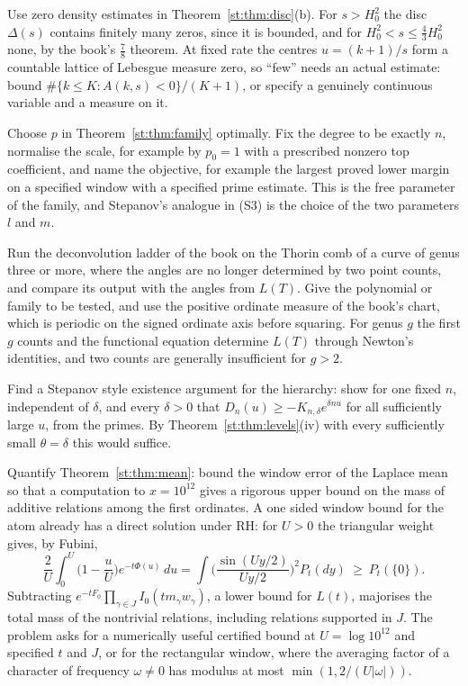 \begin{problem}\label{st:op:density}
Use zero density estimates in Theorem~\ref{st:thm:disc}(b). For $s>H_0^2$ the disc $\Delta(s)$ contains finitely many zeros, since it is bounded, and for $H_0^2<s\le\tfrac43H_0^2$ none, by the book's $\tfrac78$ theorem. At fixed rate the centres $u=(k+1)/s$ form a countable lattice of Lebesgue measure zero, so ``few'' needs an actual estimate: bound $\#\{k\le K:A(k,s)<0\}/(K+1)$, or specify a genuinely continuous variable and a measure on it.
\end{problem}
\begin{problem}\label{st:op:opt}
Choose $p$ in Theorem~\ref{st:thm:family} optimally. Fix the degree to be exactly $n$, normalise the scale, for example by $p_0=1$ with a prescribed nonzero top coefficient, and name the objective, for example the largest proved lower margin on a specified window with a specified prime estimate. This is the free parameter of the family, and Stepanov's analogue in (S3) is the choice of the two parameters $l$ and $m$.
\end{problem}
\begin{problem}\label{st:op:curve}
Run the deconvolution ladder of the book on the Thorin comb of a curve of genus three or more, where the angles are no longer determined by two point counts, and compare its output with the angles from $L(T)$. Give the polynomial or family to be tested, and use the positive ordinate measure of the book's chart, which is periodic on the signed ordinate axis before squaring. For genus $g$ the first $g$ counts and the functional equation determine $L(T)$ through Newton's identities, and two counts are generally insufficient for $g>2$.
\end{problem}
\begin{problem}\label{st:op:exist}
Find a Stepanov style existence argument for the hierarchy: show for one fixed $n$, independent of $\delta$, and every $\delta>0$ that $D_n(u)\ge-K_{n,\delta}e^{\delta nu}$ for all sufficiently large $u$, from the primes. By Theorem~\ref{st:thm:levels}(iv) with every sufficiently small $\theta=\delta$ this would suffice.
\end{problem}
\begin{problem}\label{st:op:window}
Quantify Theorem~\ref{st:thm:mean}: bound the window error of the Laplace mean so that a computation to $x=10^{12}$ gives a rigorous upper bound on the mass of additive relations among the first ordinates. A one sided window bound for the atom already has a direct solution under RH: for $U>0$ the triangular weight gives, by Fubini,
\[
\frac2U\int_0^U\Big(1-\frac uU\Big)e^{-t\Phi(u)}\,du=\int\Big(\frac{\sin(Uy/2)}{Uy/2}\Big)^2P_t(dy)\ \ge\ P_t(\{0\}).
\]
Subtracting $e^{-tF_0}\prod_{\gamma\in J}I_0(tm_\gamma w_\gamma)$, a lower bound for $L(t)$, majorises the total mass of the nontrivial relations, including relations supported in $J$. The problem asks for a numerically useful certified bound at $U=\log10^{12}$ and specified $t$ and $J$, or for the rectangular window, where the averaging factor of a character of frequency $\omega\ne0$ has modulus at most $\min(1,2/(U|\omega|))$.
\end{problem}
